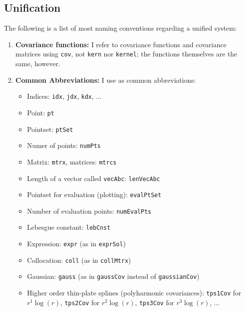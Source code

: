 \documentclass[11pt]{article}
\begin{document}
\subsection{Unification}
The following is a list of most naming conventions regarding a unified system:
\begin{enumerate}
\item \textbf{Covariance functions:} I refer to covariance functions and covariance matrices using \texttt{cov}, not \texttt{kern} nor \texttt{kernel}; the functions themselves are the same, however.
\item \textbf{Common Abbreviations:} I use as common abbreviations:
\begin{itemize}
\item Indices: \texttt{idx}, \texttt{jdx}, \texttt{kdx}, ...
\item Point: \texttt{pt}
\item Pointset: \texttt{ptSet}
\item Numer of points: \texttt{numPts}
\item Matrix: \texttt{mtrx}, matrices: \texttt{mtrcs}
\item Length of a vector called \texttt{vecAbc}: \texttt{lenVecAbc}
\item Pointset for evaluation (plotting): \texttt{evalPtSet}
\item Number of evaluation points: \texttt{numEvalPts}
\item Lebesgue constant: \texttt{lebCnst}
\item Expression: \texttt{expr} (as in \texttt{exprSol}) 
\item Collocation: \texttt{coll} (as in \texttt{collMtrx}) 
\item Gaussian: \texttt{gauss} (as in \texttt{gaussCov} instead of \texttt{gaussianCov})
\item Higher order thin-plate splines (polyharmonic covariances): \texttt{tps1Cov} for $r^1\log(r)$, \texttt{tps2Cov} for $r^2\log(r)$, \texttt{tps3Cov} for $r^3\log(r)$, ...
\end{itemize}
\end{enumerate}
\end{document}
